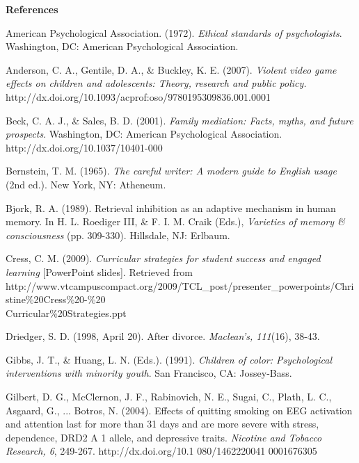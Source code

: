 \documentclass[twoside,10.5pt]{article}%
\begin{document}
\textbf{References}

\setlength{\hangindent}{2em}
American Psychological Association. (1972). \emph{Ethical standards of psychologists}. Washington, DC: American
Psychological Association.

\setlength{\hangindent}{2em}
Anderson, C. A., Gentile, D. A., {\&} Buckley, K. E. (2007).
\emph{Violent video game effects on children and adolescents:
Theory, research and public policy.}
http://dx.doi.org/10.1093/acprof:oso/9780195309836.001.0001

\setlength{\hangindent}{2em}
Beck, C. A. J., {\&} Sales, B. D. (2001). \emph{Family mediation:
Facts, myths, and future prospects}. Washington, DC: American
Psychological Association. http://dx.doi.org/10.1037/10401-000

\setlength{\hangindent}{2em}
Bernstein, T. M. (1965). \emph{The careful writer: A modern guide to English usage} (2nd ed.). New York, NY: Atheneum.

\setlength{\hangindent}{2em}
Bjork, R. A. (1989). Retrieval inhibition as an adaptive mechanism in human
memory. In H. L. Roediger III, {\&} F. I. M. Craik (Eds.), \emph{Varieties of memory {\&} consciousness} (pp. 309-330).
Hillsdale, NJ: Erlbaum.

\setlength{\hangindent}{2em}
Cress, C. M. (2009). \emph{Curricular strategies for student
success and engaged learning} [PowerPoint slides]. Retrieved from
http://www.vtcampuscompact.org/2009/TCL{\_}post/presenter{\_}powerpoints/Christine{\%}20Cress{\%}20-{\%}20\\Curricular{\%}20Strategies.ppt

\setlength{\hangindent}{2em}
Driedger, S. D. (1998, April 20). After divorce. \emph{Maclean's, 111}(16), 38-43.

\setlength{\hangindent}{2em}
Gibbs, J. T., {\&} Huang, L. N. (Eds.). (1991). \emph{Children of color: Psychological interventions with minority youth}. San Francisco, CA:
Jossey-Bass.

\setlength{\hangindent}{2em}
Gilbert, D. G., McClernon, J. F., Rabinovich, N. E., Sugai, C., Plath, L.
C., Asgaard, G., ... Botros, N. (2004). Effects of quitting smoking on EEG
activation and attention last for more than 31 days and are more severe with
stress, dependence, DRD2 A 1 allele, and depressive traits. \emph{Nicotine and Tobacco Research, 6}, 249-267.
http://dx.doi.org/10.1 080/1462220041 0001676305
\end{document}
